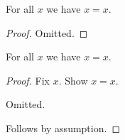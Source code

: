 \begin{proposition}\label{phase5_top_level_omitted}
    For all $x$ we have $x = x$.
\end{proposition}
\begin{proof}
    Omitted.
\end{proof}

\begin{proposition}\label{phase5_nested_omitted}
    For all $x$ we have $x = x$.
\end{proposition}
\begin{proof}
    Fix $x$.
    Show $x = x$.
    \begin{subproof}
        Omitted.
    \end{subproof}
    Follows by assumption.
\end{proof}
